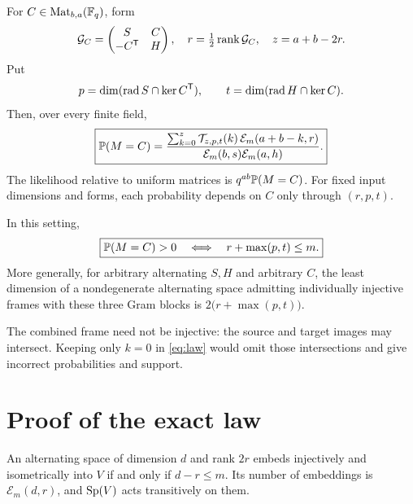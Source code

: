 \begin{theorem}\label{thm:law}
For $C\in\operatorname{Mat}_{b,a}(\mathbb F_q)$, form
\begin{equation}\label{eq:joint}
 \mathcal G_C=\begin{pmatrix}S&C\\-C^{\mathsf T}&H\end{pmatrix},
 \quad r=\tfrac12\operatorname{rank}\mathcal G_C,\quad z=a+b-2r.
\end{equation}
Put
\begin{equation}\label{eq:pt}
 p=\dim(\operatorname{rad} S\cap\ker C^{\mathsf T}),\qquad
 t=\dim(\operatorname{rad} H\cap\ker C).
\end{equation}
Then, over every finite field,
\begin{equation}\label{eq:law}
 \boxed{\displaystyle
 \mathbb P(M=C)=
 \frac{\sum_{k=0}^{z}\mathcal T_{z,p,t}(k)\,
                   \mathcal E_m(a+b-k,r)}
      {\mathcal E_m(b,s)\mathcal E_m(a,h)}.}
\end{equation}
The likelihood relative to uniform matrices is $q^{ab}\mathbb P(M=C)$.
For fixed input dimensions and forms, each probability depends on $C$
only through $(r,p,t)$.
\end{theorem}

\begin{theorem}\label{thm:support}
In this setting,
\begin{equation}\label{eq:support}
 \boxed{\mathbb P(M=C)>0\quad\Longleftrightarrow\quad r+\max(p,t)\le m.}
\end{equation}
More generally, for arbitrary alternating $S,H$ and arbitrary $C$, the
least dimension of a nondegenerate alternating space admitting
individually injective frames with these three Gram blocks is
$2\bigl(r+\max(p,t)\bigr)$.
\end{theorem}

The combined frame need not be injective: the source and target images
may intersect. Keeping only $k=0$ in \eqref{eq:law} would omit those
intersections and give incorrect probabilities and support.

\section{Proof of the exact law}\label{sec:proof}

\begin{lemma}\label{lem:embedding}
An alternating space of dimension $d$ and rank $2r$ embeds injectively
and isometrically into $V$ if and only if $d-r\le m$. Its number of
embeddings is $\mathcal E_m(d,r)$, and $\operatorname{Sp}(V)$ acts transitively on them.
\end{lemma}

